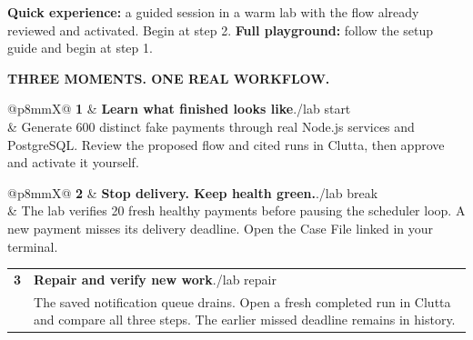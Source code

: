 \documentclass[10pt,a4paper]{article}
\makeatletter
\newcommand{\sectionlabel}[1]{{\sffamily\fontsize{8.5}{10}\selectfont\bfseries\color{blue}\MakeUppercase{#1}}}
\newcommand{\step}[4]{%
  \begin{tabularx}{\linewidth}{@{}p{8mm}X@{}}
    {\sffamily\fontsize{17}{20}\selectfont\bfseries\color{blue}#1} &
    {\sffamily\fontsize{10.8}{13}\selectfont\bfseries #2}\hfill{\fontsize{9.1}{11}\selectfont\ttfamily\color{blue}#3}\\[-0.2mm]
    & {\fontsize{10}{13.4}\selectfont #4}
  \end{tabularx}\par\vspace{3.0mm}}
\makeatother
\begin{document}
{\fontsize{9.5}{12.5}\selectfont\textbf{Quick experience:} a guided session in a warm lab with the flow already reviewed and activated. Begin at step 2. \textbf{Full playground:} follow the setup guide and begin at step 1.\par}
\vspace{3mm}
\sectionlabel{Three moments. One real workflow.}\par\vspace{3mm}
\step{1}{Learn what finished looks like}{./lab start}{Generate 600 distinct fake payments through real Node.js services and PostgreSQL. Review the proposed flow and cited runs in Clutta, then approve and activate it yourself.}
\step{2}{Stop delivery. Keep health green.}{./lab break}{The lab verifies 20 fresh healthy payments before pausing the scheduler loop. A new payment misses its delivery deadline. Open the Case File linked in your terminal.}
\step{3}{Repair and verify new work}{./lab repair}{The saved notification queue drains. Open a fresh completed run in Clutta and compare all three steps. The earlier missed deadline remains in history.}

\vspace{0.5mm}
\par
\vspace{4mm}
\end{document}
